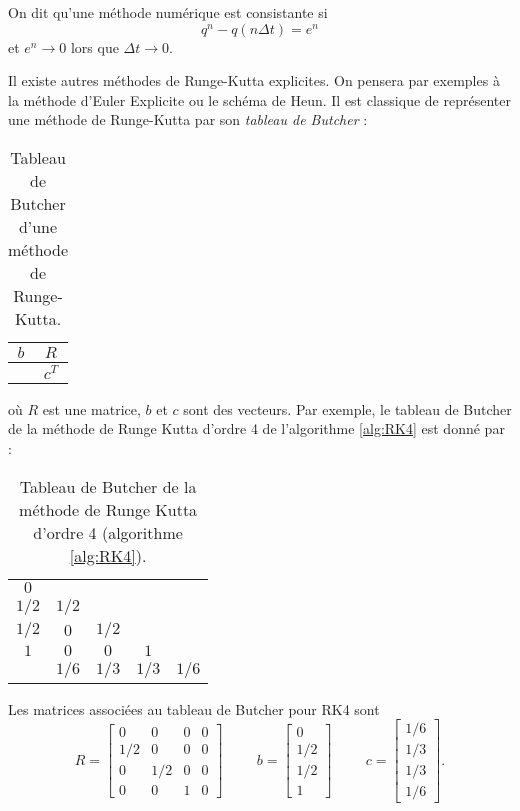 On dit qu'une méthode numérique est consistante \cite{Demailly2016} si
\begin{equation}
q^n - q(n \Delta t) = e^n
\end{equation}
et $e^n \rightarrow 0$ lors que $\Delta t \rightarrow 0$.

Il existe autres méthodes de Runge-Kutta explicites. On pensera par exemples à la méthode d'Euler Explicite ou le schéma de Heun. Il est classique de représenter une méthode de Runge-Kutta par son \textit{tableau de Butcher} :

\begin{table}[htbp]
\begin{center}
\begin{tabular}{c|c}
$b$ & $R$ \\
\hline
    & $c^T$
\end{tabular}
\end{center}
\caption{Tableau de Butcher d'une méthode de Runge-Kutta.}
\label{tab:butcher}
\end{table}

où $R$ est une matrice, $b$ et $c$ sont des vecteurs. Par exemple, le tableau de Butcher de la méthode de Runge Kutta d'ordre 4 de l'algorithme \ref{alg:RK4} est donné par :

\begin{table}[htbp]
\begin{center}
\begin{tabular}{c|cccc}
$0$   &       &      &      &      \\
$1/2$ & $1/2$ &      &      &      \\
$1/2$ & $0$   & $1/2$&      &      \\
$1$   & $0$   & $0$  & $1$  &      \\  
\hline
      & $1/6$ & $1/3$& $1/3$& $1/6$\\
\end{tabular}
\end{center}
\caption{Tableau de Butcher de la méthode de Runge Kutta d'ordre 4 (algorithme \ref{alg:RK4}).}
\end{table}
Les matrices associées au tableau de Butcher pour RK4 sont
\begin{equation}
R= \begin{bmatrix}
0 & 0 & 0 & 0 \\
1/2& 0& 0 & 0 \\
0 &1/2& 0 & 0 \\
0 & 0 & 1 & 0
\end{bmatrix}
\hspace{1cm}
b=\begin{bmatrix}
0\\1/2\\1/2\\1
\end{bmatrix}
\hspace{1cm}
c=\begin{bmatrix}
1/6\\1/3\\1/3\\1/6
\end{bmatrix}.
\end{equation}

